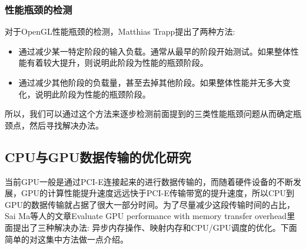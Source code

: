 \subsubsection{性能瓶颈的检测}

对于OpenGL性能瓶颈的检测，Matthias Trapp提出了两种方法:

\begin{itemize}
\item{}通过减少某一特定阶段的输入负载。通常从最早的阶段开始测试。如果整体性能有着较大提升，则说明此阶段为性能的瓶颈阶段。
\item{}通过减少其他阶段的负载量，甚至去掉其他阶段。如果整体性能并无多大变化，说明此阶段为性能的瓶颈阶段。
\end{itemize}

所以，我们可以通过这个方法来逐步检测前面提到的三类性能瓶颈问题从而确定瓶颈点，然后寻找解决办法。

\subsection{CPU与GPU数据传输的优化研究}

当前GPU一般是通过PCI-E连接起来的进行数据传输的，而随着硬件设备的不断发展，GPU的计算性能提升速度远远快于PCI-E传输带宽的提升速度，所以CPU到GPU的数据传输就占据了很大一部分时间。为了尽量减少这段传输时间的占比，Sai Ma等人的文章Evaluate GPU performance with memory transfer overhead\cite{Evaluate-GPU}里面提出了三种解决办法: 异步内存操作、映射内存和CPU/GPU调度的优化。下面简单的对这集中方法做一点介绍。

